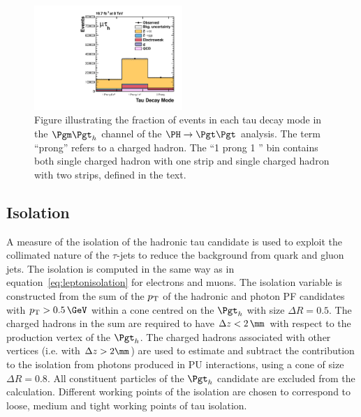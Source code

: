 \begin{figure}
\begin{center}
    \includegraphics[width=0.5\textwidth]
      {plots/reco/tau_decay_mode_inclusive_mt_2012.pdf}
\end{center}
\caption[Figure illustrating the fraction of events in each tau decay mode in the
$\mutau$ channel of the $\PH\to\Pgt\Pgt$ analysis.]
{Figure illustrating the fraction of events in each tau decay mode in the
$\mutau$ channel of the $\PH\to\Pgt\Pgt$ analysis. The term ``prong'' refers to a
charged hadron. The ``1 prong 1 \Pgpz'' bin contains both single charged hadron
with one strip and single charged hadron with two strips, defined in the text.
}
\label{fig:taudecaymode}
\end{figure}

\subsection{Isolation}
\label{sec:tauisolation}

A measure of the isolation of the hadronic tau candidate is used to exploit the
collimated nature of the $\tau$-jets to reduce the background from quark and gluon
jets. The isolation is computed in the same way as in
equation~\ref{eq:leptonisolation} for
electrons and muons. The isolation variable is constructed from 
the sum of the $p_{\mathrm{T}}$ of the
hadronic and photon \ac{PF} candidates with $\pt > 0.5\,\GeV$ within a cone centred on 
the $\Pgth$ with size $\Delta R = 0.5$. The charged hadrons in the sum are
required to have $\Delta z < 2\,\mm$ with respect to the production vertex of the
$\Pgth$. The charged hadrons associated with other vertices (i.e. with
$\Delta z > 2\mm$) are used to estimate and subtract the contribution to the isolation 
from photons produced in \ac{PU} interactions, using a cone of size $\Delta R = 0.8$. 
All constituent particles of the $\Pgth$ candidate are excluded from the
calculation. Different working points of the isolation are chosen to correspond to 
loose, medium and tight working points of tau isolation.   

